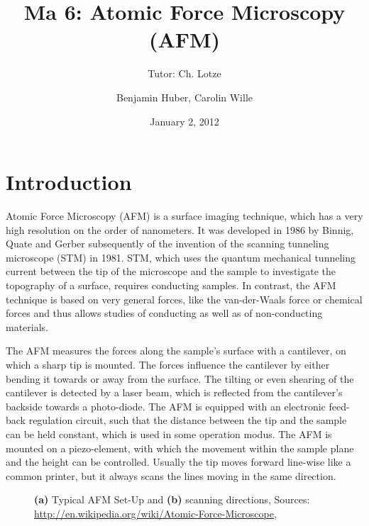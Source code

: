 \documentclass[a4paper]{scrartcl}
\title{Ma 6: Atomic Force Microscopy (AFM)}
\subtitle{Tutor: Ch. Lotze}
\author{Benjamin Huber, Carolin Wille}
\date{January 2, 2012}
\numberwithin{equation}{section}
\numberwithin{figure}{section}
\numberwithin{table}{section}
\begin{document}
\thispagestyle{empty}
\maketitle
\tableofcontents
\clearpage


\section{Introduction}
Atomic Force Microscopy (AFM) is a surface imaging technique, which has a very high resolution on the order of nanometers. It was developed in 1986 by Binnig, Quate and Gerber subsequently of the invention of the scanning tunneling microscope (STM) in 1981. STM, which uses the quantum mechanical tunneling current between the tip of the microscope and the sample to investigate the topography of a surface, requires conducting samples. In contrast, the AFM technique is based on very general forces, like the van-der-Waals force or chemical forces and thus allows studies of conducting as well as of non-conducting materials.

The AFM measures the forces along the sample's surface with a cantilever, on which a sharp tip is mounted. The forces influence the cantilever by either bending it towards or away from the surface. The tilting or even shearing of the cantilever is detected by a laser beam, which is reflected from the cantilever's backside towards a photo-diode. The AFM is equipped with an electronic feed-back regulation circuit, such that the distance between the tip and the sample can be held constant, which is used in some operation modus. The AFM is mounted on a piezo-element, with which the movement within the sample plane and the height can be controlled. Usually the tip moves forward line-wise like a common printer, but it always scans the lines moving in the same direction.

\begin{figure} 
 \centering
{}
 \hfill
{}%
\caption{
\small  \textbf{(a)} Typical AFM Set-Up and \textbf{(b)} scanning directions, Sources: \url{http://en.wikipedia.org/wiki/Atomic-Force-Microscope}, \cite{book}  } 
	\label{fig:setup}
\end{figure}
\end{document}
